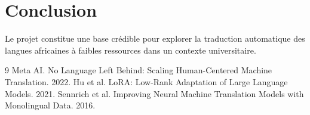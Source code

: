 \documentclass[12pt,a4paper]{report}
\begin{document}
\chapter{Conclusion}
Le projet constitue une base crédible pour explorer la traduction automatique des langues africaines à faibles ressources dans un contexte universitaire.


\begin{thebibliography}{9}
 Meta AI. No Language Left Behind: Scaling Human-Centered Machine Translation. 2022.
 Hu et al. LoRA: Low-Rank Adaptation of Large Language Models. 2021.
 Sennrich et al. Improving Neural Machine Translation Models with Monolingual Data. 2016.
\end{thebibliography}
\end{document}
